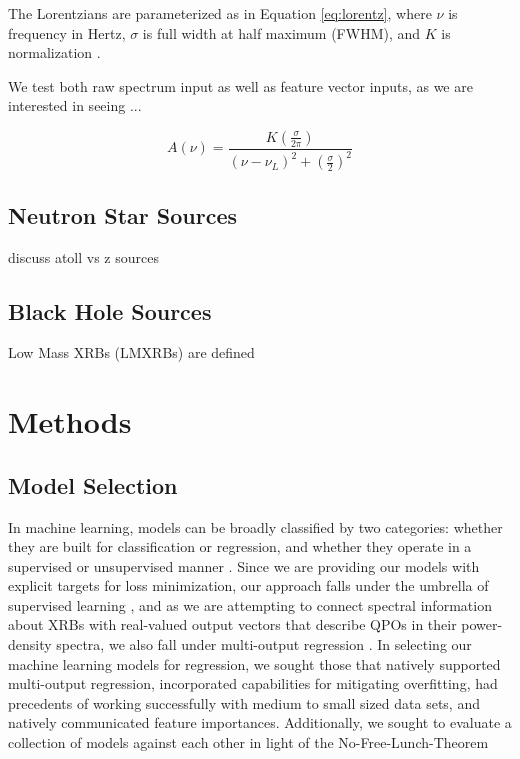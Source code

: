 \documentclass[fleqn,usenatbib]{mnras}
\begin{document}
The Lorentzians are parameterized as in Equation \ref{eq:lorentz}, where $\nu$ is frequency in Hertz, $\sigma$ is full width at half maximum (FWHM), and $K$ is normalization 
\citep{xspec12}.    

We test both raw spectrum input as well as feature vector inputs, as we are interested in seeing ... 

\begin{equation}
    A(\nu)=\frac{K(\frac{\sigma}{2\pi})}{(\nu-\nu_L)^2+(\frac{\sigma}{2})^2}
    \label{eq:lorentz}
\end{equation}


\subsection{Neutron Star Sources}
discuss atoll vs z sources 

\subsection{Black Hole Sources}

Low Mass XRBs (LMXRBs) are defined 

\section{Methods}\label{sec:methods}

\subsection{Model Selection}

In machine learning, models can be broadly classified by two categories: whether they are built for classification or regression, and whether they operate in a supervised or unsupervised manner \citep{bruce2017practical}. Since we are providing our models with explicit targets for loss minimization, our approach falls under the umbrella of supervised learning \citep{supervised_review}, and as we are attempting to connect spectral information about XRBs with real-valued output vectors that describe QPOs in their power-density spectra, we also fall under multi-output regression \citep{multioutput_review}. In selecting our machine learning models for regression, we sought those that natively supported multi-output regression, incorporated capabilities for mitigating overfitting, had precedents of working successfully with medium to small sized data sets, and natively communicated feature importances. Additionally, we sought to evaluate a collection of models against each other in light of the No-Free-Lunch-Theorem \citep{NoFreeLunch,avoidMLpitfalls} 
    
\end{document}
